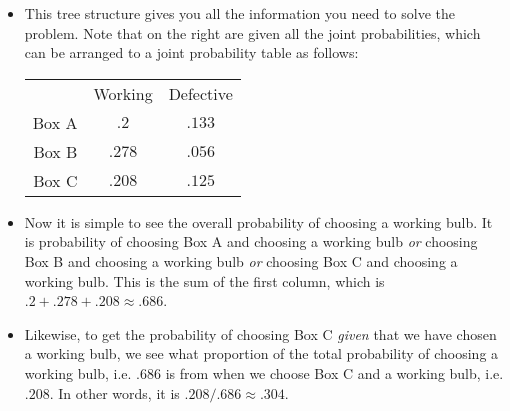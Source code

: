 \documentclass{slides}
\begin{document}
\begin{frame}
	\begin{itemize}
	\item This tree structure gives you all the information you need to solve the problem. Note that on the right are given all the joint probabilities, which can be arranged to a joint probability table as follows:
\begin{center}
\begin{tabular}{rcc}
& Working & Defective \\
Box A & $.2$ & $.133$ \\
Box B & $.278$ & $.056$ \\
Box C & $.208$ & $.125$
\end{tabular}
\end{center}
\item Now it is simple to see the overall probability of choosing a working bulb. It is probability of choosing Box A and choosing a working bulb \emph{or} choosing Box B and choosing a working bulb \emph{or} choosing Box C and choosing a working bulb. This is the sum of the first column, which is $.2+.278+.208\approx.686$. 
\item Likewise, to get the probability of choosing Box C \emph{given} that we have chosen a working bulb, we see what proportion of the total probability of choosing a working bulb, i.e. $.686$ is from when we choose Box C and a working bulb, i.e. $.208$. In other words, it is $.208/.686\approx .304$. 
%
\end{itemize}
\end{frame}
\end{document}
